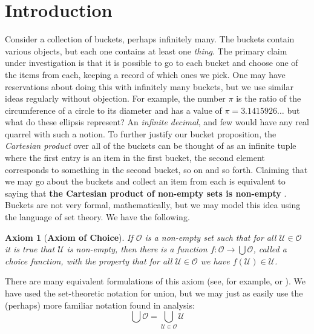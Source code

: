 \documentclass{article}
\newtheorem{axiom}{Axiom}[section]
\theoremstyle{definition}
\begin{document}
    \section{Introduction}
        Consider a collection of buckets, perhaps infinitely many. The buckets
        contain various objects, but each one contains at least one
        \textit{thing}. The primary claim under investigation is that it is
        possible to go to each bucket and choose one of the items from
        each, keeping a record of which ones we pick. One may have reservations
        about doing this with infinitely many buckets, but we use similar ideas
        regularly without objection. For example, the number $\pi$ is the
        ratio of the circumference of a circle to its diameter and has a
        value of $\pi=3.1415926\dots$ but what do these ellipsis represent?
        An \textit{infinite decimal}, and few would have any real quarrel
        with such a notion. To further justify our bucket proposition,
        the \textit{Cartesian product} over all of the buckets can be thought
        of as an infinite tuple where the first entry is an item in the
        first bucket, the second element corresponds to something in the
        second bucket, so on and so forth. Claiming that we may go about the
        buckets and collect an item from each is equivalent to saying that
        \textbf{the Cartesian product of non-empty sets is non-empty}
        \cite[p.~59]{Halmos1974}. Buckets
        are not very formal, mathematically, but we may model this idea using
        the language of set theory. We have the following.
        \begin{axiom}[\textbf{Axiom of Choice}]
            If $\mathcal{O}$ is a non-empty set such that for all
            $\mathcal{U}\in\mathcal{O}$ it is true that $\mathcal{U}$ is
            non-empty, then there is a function
            $f:\mathcal{O}\rightarrow\bigcup\mathcal{O}$, called a
            \textit{choice function}, with the property that for all
            $\mathcal{U}\in\mathcal{O}$ we have $f(\mathcal{U})\in\mathcal{U}$.
        \end{axiom}
        There are many equivalent formulations of this axiom
        (see, for example, \cite[p.~109]{MoschovakisNotesOnSetTheory} or
        \cite[p.~167]{Cunningham2010}).
        We have used the set-theoretic notation for union, but we may just as
        easily use the (perhaps) more familiar notation found in analysis:
        \begin{equation}
            \bigcup\mathcal{O}
            =\bigcup_{\mathcal{U}\in\mathcal{O}}\mathcal{U}
        \end{equation}
\end{document}
